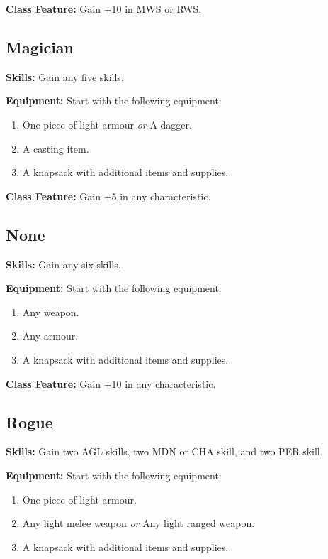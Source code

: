 \documentclass[]{article}
\providecommand{\tightlist}{%
  \setlength{\itemsep}{0pt}\setlength{\parskip}{0pt}}
\begin{document}
\textbf{Class Feature:} Gain +10 in MWS or RWS.

\subsection{Magician}\label{magician}

\textbf{Skills:} Gain any five skills.

\textbf{Equipment:} Start with the following equipment:

\begin{enumerate}
\def\labelenumi{\arabic{enumi}.}
\tightlist
\item
  One piece of light armour \emph{or} A dagger.
\item
  A casting item.
\item
  A knapsack with additional items and supplies.
\end{enumerate}

\textbf{Class Feature:} Gain +5 in any characteristic.

\subsection{None}\label{none}

\textbf{Skills:} Gain any six skills.

\textbf{Equipment:} Start with the following equipment:

\begin{enumerate}
\def\labelenumi{\arabic{enumi}.}
\tightlist
\item
  Any weapon.
\item
  Any armour.
\item
  A knapsack with additional items and supplies.
\end{enumerate}

\textbf{Class Feature:} Gain +10 in any characteristic.

\subsection{Rogue}\label{rogue}

\textbf{Skills:} Gain two AGL skills, two MDN or CHA skill, and two PER
skill.

\textbf{Equipment:} Start with the following equipment:

\begin{enumerate}
\def\labelenumi{\arabic{enumi}.}
\tightlist
\item
  One piece of light armour.
\item
  Any light melee weapon \emph{or} Any light ranged weapon.
\item
  A knapsack with additional items and supplies.
\end{enumerate}
\end{document}
